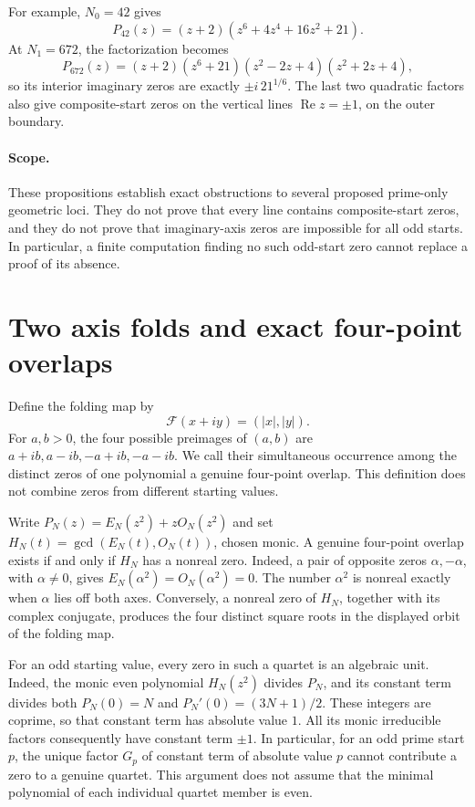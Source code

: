 \documentclass[11pt,a4paper]{article}
\theoremstyle{definition}
\theoremstyle{remark}
\numberwithin{equation}{section}
\begin{document}
For example, $N_0=42$ gives
\[
 P_{42}(z)=(z+2)(z^6+4z^4+16z^2+21).
\]
At $N_1=672$, the factorization becomes
\[
 P_{672}(z)=(z+2)(z^6+21)(z^2-2z+4)(z^2+2z+4),
\]
so its interior imaginary zeros are exactly $\pm i\,21^{1/6}$.
The last two quadratic factors also give composite-start zeros on the
vertical lines $\operatorname{Re}z=\pm1$, on the outer boundary.

\paragraph{Scope.}
These propositions establish exact obstructions to several proposed
prime-only geometric loci. They do not prove that every line contains
composite-start zeros, and they do not prove that imaginary-axis zeros
are impossible for all odd starts. In particular, a finite computation
finding no such odd-start zero cannot replace a proof of its absence.


\section{Two axis folds and exact four-point overlaps}\label{C:sec:two-folds}

Define the folding map by
\[
 \mathcal F(x+iy)=(|x|,|y|).
\]
For $a,b>0$, the four possible preimages of $(a,b)$ are
$a+ib,a-ib,-a+ib,-a-ib$. We call their simultaneous occurrence among
the distinct zeros of one polynomial a genuine four-point overlap.
This definition does not combine zeros from different starting values.

Write $P_N(z)=E_N(z^2)+zO_N(z^2)$ and set
$H_N(t)=\gcd(E_N(t),O_N(t))$, chosen monic. A genuine four-point
overlap exists if and only if $H_N$ has a nonreal zero. Indeed, a pair
of opposite zeros $\alpha,-\alpha$, with $\alpha\ne0$, gives
$E_N(\alpha^2)=O_N(\alpha^2)=0$. The number $\alpha^2$ is nonreal
exactly when $\alpha$ lies off both axes. Conversely, a nonreal zero
of $H_N$, together with its complex conjugate, produces the four
distinct square roots in the displayed orbit of the folding map.

For an odd starting value, every zero in such a quartet is an algebraic
unit. Indeed, the monic even polynomial $H_N(z^2)$ divides $P_N$, and
its constant term divides both $P_N(0)=N$ and
$P_N'(0)=(3N+1)/2$. These integers are coprime, so that constant term
has absolute value $1$. All its monic irreducible factors consequently
have constant term $\pm1$. In particular, for an odd prime start $p$,
the unique factor $G_p$ of constant term of absolute value $p$ cannot
contribute a zero to a genuine quartet. This argument does not assume
that the minimal polynomial of each individual quartet member is even.
\end{document}
